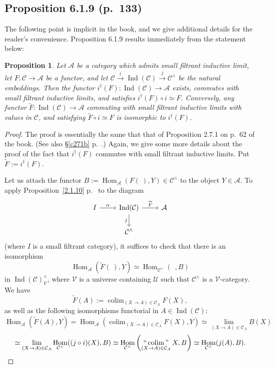 \documentclass[12pt]{article}%
\newtheorem{prop}[thm]{Proposition}
\theoremstyle{remark}
\theoremstyle{definition}
\newcommand{\A}{\mathcal A}
\newcommand{\C}{\mathcal C}
\newcommand{\U}{\mathcal U}
\newcommand{\V}{\mathcal V}
\DeclareMathOperator*{\colim}{colim}
\DeclareMathOperator*{\icolim}{``\colim"}
\DeclareMathOperator{\Hom}{Hom}%
\DeclareMathOperator{\Ind}{Ind}
\begin{document}

\subsection{Proposition 6.1.9 (p.~133)}\label{619}

The following point is implicit in the book, and we give additional details for the reader's convenience. Proposition 6.1.9 results immediately from the statement below:

\begin{prop} 
Let $\A$ be a category which admits small filtrant inductive limit, let $F:\C\to\A$ be a functor, and let $\C\overset{i}{\to}\Ind(\C)\overset{j}{\to}\C^\wedge$ be the natural embeddings. Then the functor $i^\dagger(F):\Ind(\C)\to\A$ exists, commutes with small filtrant inductive limits, and satisfies $i^\dagger(F)\circ i\simeq F$. Conversely, any functor $\widetilde F:\Ind(\C)\to\A$ commuting with small filtrant inductive limits with values in $\C$, and satisfying $\widetilde F\circ i\simeq F$ is isomorphic to $i^\dagger(F)$. 
\end{prop} 
%
\begin{proof}
The proof is essentially the same that that of Proposition 2.7.1 on p.~62 of the book. (See also \S\ref{c271b} p.~\pageref{c271b}.) Again, we give some more details about the proof of the fact that $i^\dagger(F)$ commutes with small filtrant inductive limits. Put $\widetilde F:=i^\dagger(F)$. 

Let us attach the functor $B:=\Hom_\A(F(\ ),Y)\in\C^\wedge$ to the object $Y\in\A$. To apply Proposition~\ref{2.1.10} p.~\pageref{2.1.10} to the diagram 
$$
\begin{tikzcd}
I\ar{r}{\alpha}&\Ind(\C)\ar{d}[swap]{j}\ar{r}{\widetilde F}&\A\\
&\C^\wedge
\end{tikzcd}
$$
(where $I$ is a small filtrant category), it suffices to check that there is an isomorphism 
$$
\Hom_\A\left(\widetilde F(\ ),Y\right)\simeq
\Hom_{\C^\wedge}(\ \ ,B)
$$ 
in $\Ind(\C)^\wedge_\V$, where $\V$ is a universe containing $\U$ such that $\C^\wedge$ is a $\V$-category. %
We have 
$$
\widetilde F(A):=\colim_{(X\to A)\in\C_A}F(X),
$$ 
as well as the following isomorphisms functorial in $A\in\Ind(\C)$:
$$
\Hom_\A\left(\widetilde F(A),Y\right)=
\Hom_\A\left(\colim_{(X\to A)\in\C_A}F(X),Y\right)\simeq
\lim_{(X\to A)\in\C_A}B(X)
$$
$$
\simeq
\lim_{(X\to A)\in\C_A}\Hom_{\C^\wedge}((j\circ i)(X),B)
\simeq
\Hom_{\C^\wedge}\left(\icolim_{(X\to A)\in\C_A}X,B\right)\simeq
\Hom_{\C^\wedge}(j(A),B).
$$
\end{proof}
\end{document}
